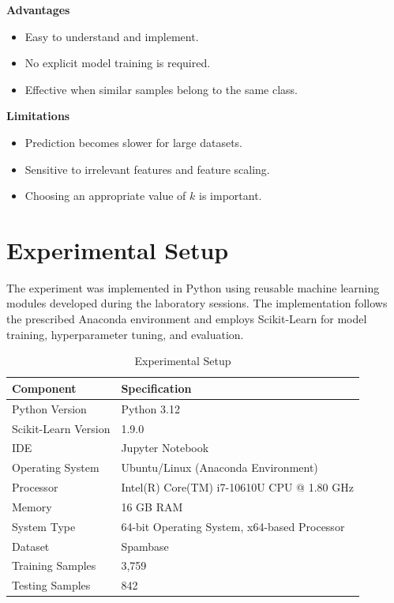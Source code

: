 \documentclass[12pt,a4paper]{article}
\begin{document}
	\textbf{Advantages}
	
	\begin{itemize}
		\item Easy to understand and implement.
		\item No explicit model training is required.
		\item Effective when similar samples belong to the same class.
	\end{itemize}
	
	\textbf{Limitations}
	
	\begin{itemize}
		\item Prediction becomes slower for large datasets.
		\item Sensitive to irrelevant features and feature scaling.
		\item Choosing an appropriate value of $k$ is important.
	\end{itemize}
	
	\section{Experimental Setup}
	
	The experiment was implemented in Python using reusable machine learning modules developed during the laboratory sessions. The implementation follows the prescribed Anaconda environment and employs Scikit-Learn for model training, hyperparameter tuning, and evaluation.
	
	\begin{table}[H]
		\centering
		\caption{Experimental Setup}
		\begin{tabular}{ll}
			\toprule
			Component & Specification\\
			\midrule
			Python Version & Python 3.12\\
			Scikit-Learn Version & 1.9.0\\
			IDE & Jupyter Notebook\\
			Operating System & Ubuntu/Linux (Anaconda Environment)\\
			Processor & Intel(R) Core(TM) i7-10610U CPU @ 1.80 GHz\\
			Memory & 16 GB RAM\\
			System Type & 64-bit Operating System, x64-based Processor\\
			Dataset & Spambase\\
			Training Samples & 3,759\\
			Testing Samples & 842\\
			\bottomrule
		\end{tabular}
	\end{table}
	
\end{document}
